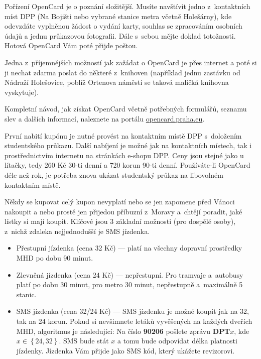 Pořízení OpenCard je o poznání složitější. Musíte navštívit jedno z~kontaktních míst DPP (Na Bojišti nebo vybrané stanice metra včetně Holešárny), kde odevzdáte vyplněnou žádost o vydání karty, souhlas se zpracováním osobních údajů a jednu průkazovou fotografii. Dále s~sebou mějte doklad totožnosti. Hotová OpenCard Vám poté přijde poštou.

Jedna z~příjemnějších možností jak zažádat o OpenCard je přes internet a poté si ji nechat zdarma poslat do některé z~knihoven (například jednu zastávku od Nádraží Holešovice, poblíž Ortenova náměstí se taková maličká knihovna vyskytuje).

Kompletní návod, jak získat OpenCard včetně potřebných formulářů, seznamu slev a dalších informací, naleznete na portálu \url{opencard.praha.eu}.

První nabití kupónu je nutné provést na kontaktním místě DPP s~doložením studentského průkazu. Další nabíjení je možné jak na kontaktních místech, tak i prostřednictvím internetu na stránkách e-shopu DPP. Ceny jsou stejné jako u lítačky, tedy 260 Kč 30-ti denní a 720 korun 90-ti denní. Používáte-li OpenCard déle než rok, je potřeba znova ukázat studentský průkaz na libovolném kontaktním místě.



Někdy se kupovat celý kupon nevyplatí nebo se jen zapomene před
Vánoci nakoupit a nebo prostě jen přijedou příbuzní z~Moravy
a~chtějí poradit, jaké lístky si mají koupit. Klíčové jsou 3
základní možnosti (pro dospělé osoby), z~nichž zdaleka nejjednodušší je SMS jízdenka.

\begin{itemize}

\item Přestupní jízdenka (cena 32 Kč) --- platí na všechny dopravní
prostředky MHD po dobu 90 minut.

\item Zlevněná jízdenka (cena 24 Kč) --- nepřestupní. Pro tramvaje
a~autobusy platí po dobu 30 minut, pro metro 30 minut, nepřestupně
a~maximálně 5 stanic.

\item SMS jízdenka (cena 32/24 Kč) --- SMS jízdenku je možné koupit jak na 32, tak na 24 korun. Pokud si nevšimnete letáků vyvěšených na každých dveřích MHD, algoritmus je následující: Na číslo {\bf 90206} pošlete zprávu {\bf DPT$x$}, kde $x\in\left\{24, 32\right\}$. SMS bude stát $x$ a tomu bude odpovídat délka platnosti jízdenky. Jízdenka Vám přijde jako SMS kód, který ukážete revizorovi.

\end{itemize}

